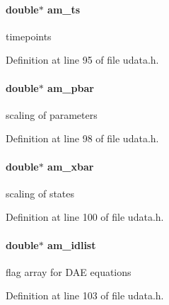\hypertarget{struct_user_data_a368434a79bdb1655bef3adc552834ddc}{}
\paragraph[{am\+\_\+ts}]{\setlength{\rightskip}{0pt plus 5cm}double$\ast$ am\+\_\+ts}\label{struct_user_data_a368434a79bdb1655bef3adc552834ddc}
timepoints 

Definition at line 95 of file udata.\+h.

\hypertarget{struct_user_data_aa73d75cc02e28bcdf108cbea53e615e9}{}
\paragraph[{am\+\_\+pbar}]{\setlength{\rightskip}{0pt plus 5cm}double$\ast$ am\+\_\+pbar}\label{struct_user_data_aa73d75cc02e28bcdf108cbea53e615e9}
scaling of parameters 

Definition at line 98 of file udata.\+h.

\hypertarget{struct_user_data_ad21f2b82715b051daf2775ed059afdbb}{}
\paragraph[{am\+\_\+xbar}]{\setlength{\rightskip}{0pt plus 5cm}double$\ast$ am\+\_\+xbar}\label{struct_user_data_ad21f2b82715b051daf2775ed059afdbb}
scaling of states 

Definition at line 100 of file udata.\+h.

\hypertarget{struct_user_data_ab62bd78b1593ddbf3d854356b4dcaa0f}{}
\paragraph[{am\+\_\+idlist}]{\setlength{\rightskip}{0pt plus 5cm}double$\ast$ am\+\_\+idlist}\label{struct_user_data_ab62bd78b1593ddbf3d854356b4dcaa0f}
flag array for D\+A\+E equations 

Definition at line 103 of file udata.\+h.

\hypertarget{struct_user_data_a3bd631d595b8a864de83f25a1756ce3d}{}
